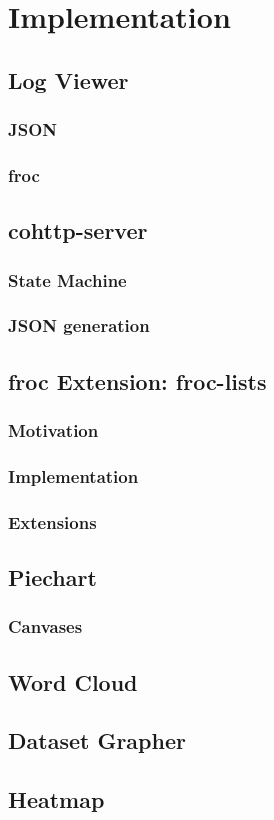 \chapter{Implementation}

\section{Log Viewer}
\subsection{JSON}
\subsection{froc}

\section{cohttp-server}
\subsection{State Machine}
\subsection{JSON generation}

\section{froc Extension: froc-lists}
\subsection{Motivation}
\subsection{Implementation}
\subsection{Extensions}

\section{Piechart}
\subsection{Canvases}

\section{Word Cloud}

\section{Dataset Grapher}

\section{Heatmap}
